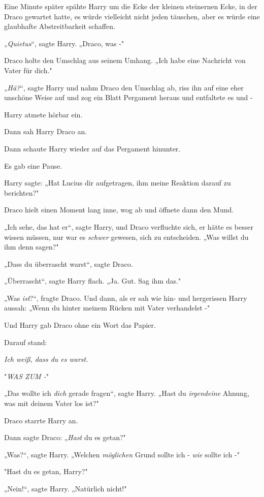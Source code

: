 {Eine Minute später spähte Harry um die Ecke der kleinen steinernen Ecke, in der Draco gewartet hatte, es würde vielleicht nicht jeden täuschen, aber es würde eine glaubhafte Abstreitbarkeit schaffen.

„\emph{Quietus}“, sagte Harry. „Draco, was -"

Draco holte den Umschlag aus seinem Umhang. „Ich habe eine Nachricht von Vater für dich."

„\emph{Hä?}“, sagte Harry und nahm Draco den Umschlag ab, riss ihn auf eine eher unschöne Weise auf und zog ein Blatt Pergament heraus und entfaltete es und -

Harry atmete hörbar ein.

Dann sah Harry Draco an.

Dann schaute Harry wieder auf das Pergament hinunter.

Es gab eine Pause.

Harry sagte: „Hat Lucius dir aufgetragen, ihm meine Reaktion darauf zu berichten?"

Draco hielt einen Moment lang inne, wog ab und öffnete dann den Mund.

„Ich sehe, das hat er“, sagte Harry, und Draco verfluchte sich, er hätte es besser wissen müssen, nur war es \emph{schwer} gewesen, sich zu entscheiden. „Was willst du ihm denn sagen?"

„Dass du überrascht warst“, sagte Draco.

„Überrascht“, sagte Harry flach. „Ja. Gut. Sag ihm das."

„Was \emph{ist}?“, fragte Draco. Und dann, als er sah wie hin- und hergerissen Harry aussah: „Wenn du hinter meinem Rücken mit Vater verhandelst -"

Und Harry gab Draco ohne ein Wort das Papier.

Darauf stand:

\emph{\emph{Ich weiß, dass du es warst.}}

"\emph{WAS ZUM -}"

„Das wollte ich \emph{dich} gerade fragen“, sagte Harry. „Hast du \emph{irgendeine} Ahnung, was mit deinem Vater los ist?"

Draco starrte Harry an.

Dann sagte Draco: „\emph{Hast} du es getan?"

„Was?“, sagte Harry. „Welchen \emph{möglichen} Grund sollte ich - \emph{wie} sollte ich -"

"Hast du es getan, Harry?"

„Nein!“, sagte Harry. „Natürlich nicht!"

}

